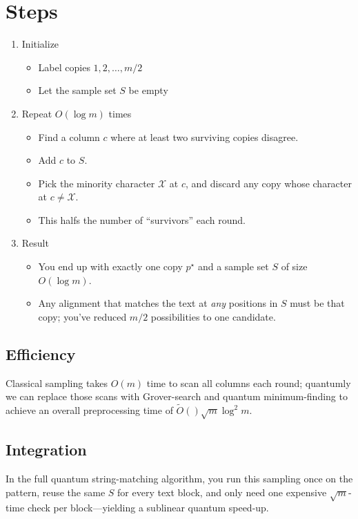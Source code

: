 \documentclass[11pt]{article}
\begin{document}
\section*{Steps}
\begin{enumerate}
    \item Initialize \begin{itemize}
              \item Label copies \(1, 2, \dots, m/2\)
              \item Let the sample set \(S\) be empty
          \end{itemize}
    \item Repeat \(O(\log m)\) times \begin{itemize}
              \item Find a column \(c\) where at least two surviving copies disagree.
              \item Add \(c\) to \(S\).
              \item Pick the minority character \(\mathcal{X}\) at \(c\), and discard any copy whose character at \(c \neq \mathcal{X}\).
              \item This halfs the number of ``survivors'' each round.
          \end{itemize}
    \item Result \begin{itemize}
              \item You end up with exactly one copy \(p^\star\) and a sample set \(S\) of size \(O(\log m)\).
              \item Any alignment that matches the text at \textit{any} positions in \(S\) must be that copy; you've reduced \(m/2\) possibilities to one candidate.
          \end{itemize}
\end{enumerate}

\subsection*{Efficiency}
Classical sampling takes \(O(m)\) time to scan all columns each round; quantumly we can replace those scans with Grover-search and quantum minimum-finding to achieve an overall preprocessing time of \(\widetilde{O}()\sqrt{m} \log^2 m\).

\subsection*{Integration}
In the full quantum string-matching algorithm, you run this sampling once on the pattern, reuse the same \(S\) for every text block, and only need one expensive \(\sqrt{m}\)-time check per block—yielding a sublinear quantum speed-up.
\end{document}
